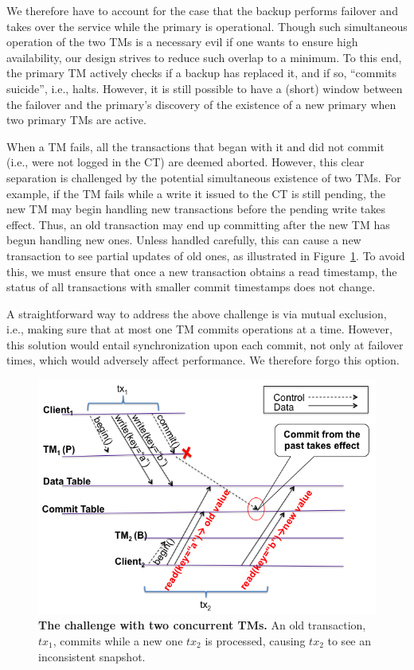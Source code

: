 We therefore have to account for the case that the backup performs failover and takes over the service while the primary is operational. 
Though such simultaneous operation of the two TMs is a necessary evil if one wants to ensure high availability, our design strives to reduce such overlap to a minimum. To this end, the primary TM actively checks if a backup has replaced it, and if so, ``commits suicide'', i.e., halts. However, it is still possible to have a (short) window between the failover and the primary's discovery of the existence of a new primary when two primary TMs are active. 

When a TM fails, all the transactions that began with it and did not commit (i.e., were not logged in the CT) are deemed aborted. 
However, this clear separation is challenged by the potential simultaneous existence of two TMs. For example, if the TM fails while a write it issued to the CT is still pending, the new TM may begin handling new transactions before the pending write takes effect. Thus, 
an old transaction may end up committing after the new TM has begun handling new ones. Unless handled carefully, this can cause a new transaction to see partial updates of old ones, as illustrated in Figure~\ref{fig:2TMs}.
To avoid this, we must ensure that once a new transaction obtains a read timestamp, the status of all transactions with smaller commit timestamps does not change.

A straightforward way to address the above challenge is via mutual exclusion, i.e., making sure that at most one TM commits operations at a time. However, this solution would entail synchronization upon each commit, not only at failover times, which would adversely affect performance. We therefore forgo this option.

\begin{figure}[t]
\includegraphics[width=\columnwidth]{omid_ha1.png}
\caption{{\bf The challenge with two concurrent TMs.} An old transaction, $tx_1$, commits while a new one $tx_2$ is processed, causing $tx_2$ to see an inconsistent snapshot. }
\label{fig:2TMs}
\end{figure}

